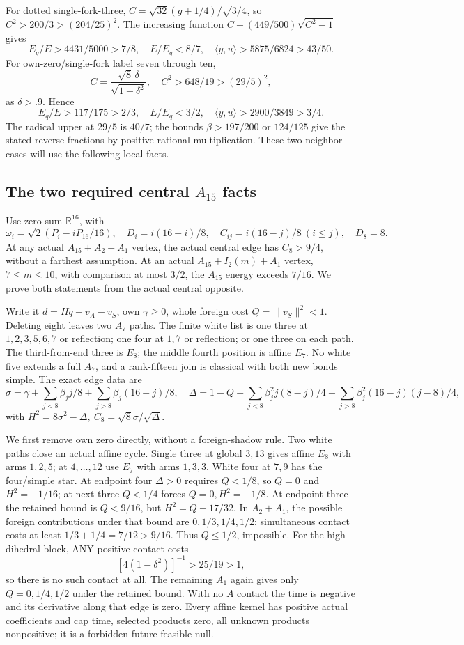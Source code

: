 \documentclass[11pt]{article}
\theoremstyle{definition}
\theoremstyle{remark}
\newcommand{\ip}[2]{\langle #1,#2\rangle}
\newcommand{\norm}[1]{\lVert #1\rVert}
\begin{document}
For dotted single-fork-three,
\(C=\sqrt{32}(g+1/4)/\sqrt{3/4}\), so
\(C^2>200/3>(204/25)^2\).
The increasing function \(C-(449/500)\sqrt{C^2-1}\) gives
\[
 E_q/E>4431/5000>7/8,\quad E/E_q<8/7,\quad
 \ip yu>5875/6824>43/50 .
\]
For own-zero/single-fork label seven through ten,
\[
 C=\frac{\sqrt8\,\delta}{\sqrt{1-\delta^2}},\quad
 C^2>648/19>(29/5)^2 ,
\]
as \(\delta>.9\). Hence
\[
 E_q/E>117/175>2/3,\quad E/E_q<3/2,\quad
 \ip yu>2900/3849>3/4 .
\]
The radical upper at \(29/5\) is \(40/7\);
the bounds \(\beta>197/200\) or \(124/125\) give the stated
reverse fractions by positive rational multiplication.
These two neighbor cases will use the following local facts.

\subsection{The two required central \(A_{15}\) facts}
\label{app:D18localA15}
Use zero-sum \(\mathbb R^{16}\), with
\[
 \omega_i=\sqrt2(P_i-iP_{16}/16),\quad
 D_i=i(16-i)/8,\quad C_{ij}=i(16-j)/8\ (i\leq j),\quad D_8=8 .
\]
At any actual \(A_{15}+A_2+A_1\) vertex, the actual central
edge has \(C_8>9/4\), without a farthest assumption.
At an actual \(A_{15}+I_2(m)+A_1\) vertex, \(7\leq m\leq10\),
with comparison at most \(3/2\), the \(A_{15}\) energy exceeds
\(7/16\). We prove both statements from the actual central opposite.

Write it \(d=Hq-v_A-v_S\), own \(\gamma\geq0\),
whole foreign cost \(Q=\norm{v_S}^2<1\).
Deleting eight leaves two \(A_7\) paths.
The finite white list is one three at
\(1,2,3,5,6,7\) or reflection; one four at \(1,7\)
or reflection; or one three on each path.
The third-from-end three is \(E_8\); the middle fourth position
is affine \(E_7\). No white five extends a full \(A_7\), and
a rank-fifteen join is classical with both new bonds simple.
The exact edge data are
\[
 \sigma=\gamma+
 \sum_{j<8}\beta_jj/8+\sum_{j>8}\beta_j(16-j)/8,\quad
 \Delta=1-Q-\sum_{j<8}\beta_j^2j(8-j)/4
             -\sum_{j>8}\beta_j^2(16-j)(j-8)/4 ,
\]
with \(H^2=8\sigma^2-\Delta,\ C_8=\sqrt8\sigma/\sqrt\Delta\).

We first remove own zero directly, without a foreign-shadow rule.
Two white paths close an actual affine cycle.
Single three at global \(3,13\) gives affine \(E_8\)
with arms \(1,2,5\); at \(4,\ldots,12\) use \(E_7\)
with arms \(1,3,3\).
White four at \(7,9\) has the four/simple star.
At endpoint four \(\Delta>0\) requires \(Q<1/8\),
so \(Q=0\) and \(H^2=-1/16\);
at next-three \(Q<1/4\) forces \(Q=0,H^2=-1/8\).
At endpoint three the retained bound is \(Q<9/16\),
but \(H^2=Q-17/32\).
In \(A_2+A_1\), the possible foreign contributions under that
bound are \(0,1/3,1/4,1/2\); simultaneous contact costs
at least \(1/3+1/4=7/12>9/16\).
Thus \(Q\leq1/2\), impossible.
For the high dihedral block, ANY positive contact costs
\[
 [4(1-\delta^2)]^{-1}>25/19>1 ,
\]
so there is no such contact at all. The remaining \(A_1\)
again gives only \(Q=0,1/4,1/2\) under the retained bound.
With no \(A\) contact the time is negative and its derivative
along that edge is zero.
Every affine kernel has positive actual coefficients and cap time,
selected products zero, all unknown products nonpositive;
it is a forbidden future feasible null.
\end{document}
